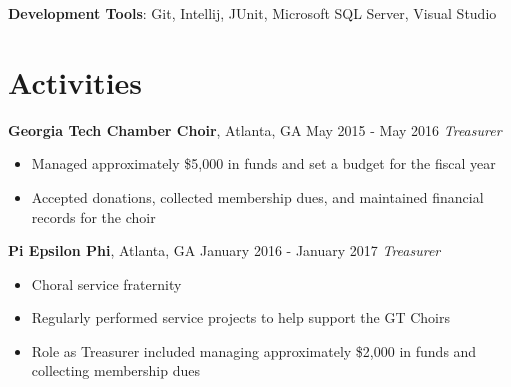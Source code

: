 \documentclass[10pt]{article}
\begin{document}
\textbf{Development Tools}: Git, Intellij, JUnit, Microsoft SQL Server, Visual Studio

\section*{Activities}
\textbf{Georgia Tech Chamber Choir}, Atlanta, GA \hfill May 2015 - May 2016
\linebreak
\textit{Treasurer}
\begin{itemize}
    \item Managed approximately \$5,000 in funds and set a budget for the fiscal year
    \item Accepted donations, collected membership dues, and maintained financial records for the choir
\end{itemize}

\vspace{3pt}

\textbf{Pi Epsilon Phi}, Atlanta, GA \hfill January 2016 - January 2017
\linebreak
\textit{Treasurer}
\begin{itemize}
    \item Choral service fraternity
    \item Regularly performed service projects to help support the GT Choirs
    \item Role as Treasurer included managing approximately \$2,000 in funds and collecting membership dues
\end{itemize}
\end{document}
